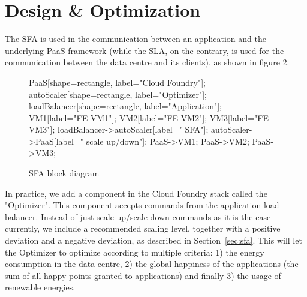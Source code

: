 \section{Design \& Optimization}
\label{sec:implem}

The SFA is used in the communication between an application and the underlying PaaS framework (while the SLA, on the contrary, is used for the communication between the data centre and its clients), as shown in figure 2.

\begin{figure}[h]
\label{fig:SFABlock}
\centering
{}
{
   PaaS[shape=rectangle, label="Cloud Foundry"];
   autoScaler[shape=rectangle, label="Optimizer"];
   loadBalancer[shape=rectangle, label="Application"];
   VM1[label="FE VM1"];
   VM2[label="FE VM2"];
   VM3[label="FE VM3"];
   loadBalancer->autoScaler[label=" SFA"];
   autoScaler->PaaS[label=" scale up/down"];
   PaaS->VM1;
   PaaS->VM2;
   PaaS->VM3;
}
\caption{SFA block diagram}
\end{figure}

In practice, we add a component in the Cloud Foundry stack called the "Optimizer".
This component accepts commands from the application load balancer.
Instead of just scale-up/scale-down commands as it is the case currently, we include a recommended scaling level, together with a positive deviation and a negative deviation, as described in Section~\ref{sec:sfa}.
This will let the Optimizer to optimize according to multiple criteria: 1) the energy consumption in the data centre, 2) the global happiness of the applications (the sum of all happy points granted to applications) and finally 3) the usage of renewable energies.